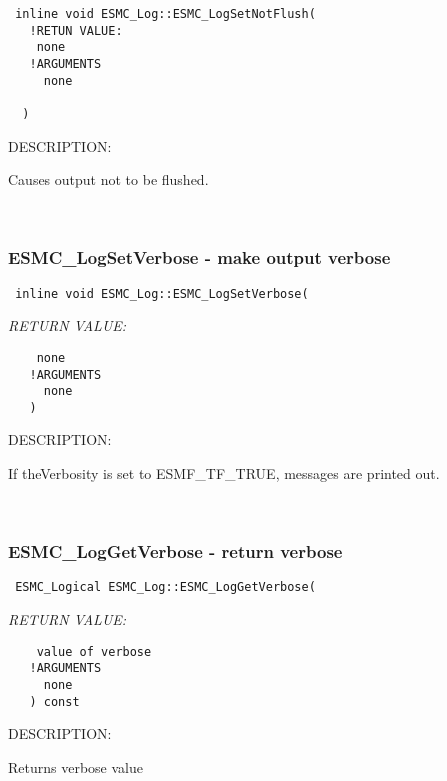 \begin{verbatim} 	     
 inline void ESMC_Log::ESMC_LogSetNotFlush(
   !RETUN VALUE:
    none
   !ARGUMENTS        
     none   
 
  )    
 	     \end{verbatim}
{\sf DESCRIPTION:\\ }


   Causes output not to be flushed. 
 
\mbox{}\hrulefill\ 
 

  \subsubsection [ESMC\_LogSetVerbose] {ESMC\_LogSetVerbose - make output verbose }


  
\begin{verbatim} 
 inline void ESMC_Log::ESMC_LogSetVerbose(\end{verbatim}{\em RETURN VALUE:}
\begin{verbatim}    none
   !ARGUMENTS
     none
   )
 \end{verbatim}
{\sf DESCRIPTION:\\ }


   If theVerbosity is set to ESMF\_TF\_TRUE, messages are printed out. 
    
 
\mbox{}\hrulefill\ 
 

  \subsubsection [ESMC\_LogGetVerbose] {ESMC\_LogGetVerbose - return verbose }


  
\begin{verbatim} 
 ESMC_Logical ESMC_Log::ESMC_LogGetVerbose(\end{verbatim}{\em RETURN VALUE:}
\begin{verbatim}    value of verbose
   !ARGUMENTS
     none
   ) const
 \end{verbatim}
{\sf DESCRIPTION:\\ }


   Returns  verbose value 
    
 
